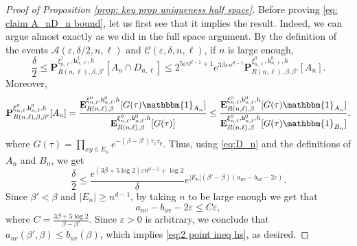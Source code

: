 \documentclass[11pt,a4paper]{article}
\numberwithin{equation}{section}
\theoremstyle{plain}
\theoremstyle{definition}
\begin{document}
\begin{proof}[Proof of Proposition \textup{\ref{prop: key prop uniqueness half space}}]
Before proving \eqref{eq: claim A_nD_n bound}, let us first see that it implies the result. Indeed, we can argue almost exactly as we did in the full space argument. By the definition of the events $\mathcal{A}(\varepsilon,\delta/2,n,\ell)$ and $\mathcal{C}(\varepsilon,\delta,n,\ell)$, if $n$ is large enough,
\begin{equation} \label{eq:D_n}
\frac{\delta}{2}\leq \mathbf P^{\xi^1_{n,\ell}, \mathsf b^1_{n,\ell},h}_{R(n,\ell), \beta,\beta'}[A_n \cap D_{n,\ell}] \leq 2^{5\varepsilon n^{d-1}+1} e^{3\beta \varepsilon n^{d-1}} \mathbf P^{\xi^0_{n,\ell}, \mathsf b^0_{n,\ell}, h}_{R(n,\ell),\beta,\beta'}[A_n].
\end{equation}
Moreover,
\begin{equation}
\mathbf P^{\xi^0_{n,\ell}, \mathsf b^0_{n,\ell}, h}_{R(n,\ell),\beta,\beta'}[A_n]=\frac{\mathbf E^{\xi^0_{n,\ell}, \mathsf b^0_{n,\ell}, h}_{R(n,\ell),\beta}[G(\tau) \mathbbm{1}_{A_n}]}{\mathbf E^{\xi^0_{n,\ell}, \mathsf b^0_{n,\ell}, h}_{R(n,\ell),\beta}[G(\tau)]}\le \frac{\mathbf E^{\xi^0_{n,\ell}, \mathsf b^0_{n,\ell}, h}_{R(n,\ell),\beta}[G(\tau) \mathbbm{1}_{A_n}]}{\mathbf E^{\xi^0_{n,\ell}, \mathsf b^0_{n,\ell}, h}_{R(n,\ell),\beta}[G(\tau)\mathbbm{1}_{B_n}]},
\end{equation}
where $G(\tau)=\prod_{xy\in E_n} e^{-(\beta-\beta')\tau_x \tau_y}$. Thus, using \eqref{eq:D_n} and the definitions of $A_n$ and $B_n$, we get
\begin{equation}
\frac{\delta}{2}\le \frac{e^{(3\beta+5\log 2) \varepsilon n^{d-1}+\log 2}}{\delta} e^{|E_n|(\beta'-\beta)(a_{uv}-b_{uv}-2\varepsilon)}.
\end{equation}
Since $\beta'<\beta$ and $|E_n|\geq n^{d-1}$, by taking $n$ to be large enough we get that 
\begin{equation}
a_{uv}-b_{uv}-2\varepsilon \leq  C\varepsilon,
\end{equation}
where $C=\tfrac{3\beta+5\log 2}{\beta-\beta'}$. Since $\varepsilon>0$ is arbitrary, we conclude that $a_{uv}(\beta',\beta)\leq b_{uv}(\beta)$, which implies \eqref{eq:2 point ineq hs}, as desired.


\end{proof}
\end{document}
